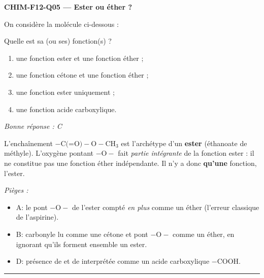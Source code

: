 \documentclass[11pt,a4paper]{article}
\begin{document}
\noindent\textbf{CHIM-F12-Q05 --- Ester ou éther ?}\par
On considère la molécule ci-dessous :
\begin{center}\end{center}
Quelle est sa (ou ses) fonction(s) ?
\begin{enumerate}[label=\Alph*)]
\item une fonction ester et une fonction éther ;
\item une fonction cétone et une fonction éther ;
\item une fonction ester uniquement ;
\item une fonction acide carboxylique.
\end{enumerate}
\textit{Bonne réponse : C}\par
L'enchaînement $-\text{C(=O)}-\text{O}-\text{CH}_3$ est l'archétype d'un \textbf{ester} (éthanoate de méthyle). L'oxygène pontant $-\text{O}-$ fait \emph{partie intégrante} de la fonction ester : il ne constitue pas une fonction éther indépendante. Il n'y a donc \textbf{qu'une} fonction, l'ester.\par
\textit{Pièges :}
\begin{itemize}
\item A: le pont $-\text{O}-$ de l'ester compté \emph{en plus} comme un éther (l'erreur classique de l'aspirine).
\item B: carbonyle lu comme une cétone et pont $-\text{O}-$ comme un éther, en ignorant qu'ils forment ensemble un ester.
\item D: présence de  et de  interprétée comme un acide carboxylique $-\text{COOH}$.
\end{itemize}
\vspace{8pt}\hrule\vspace{8pt}
\end{document}
